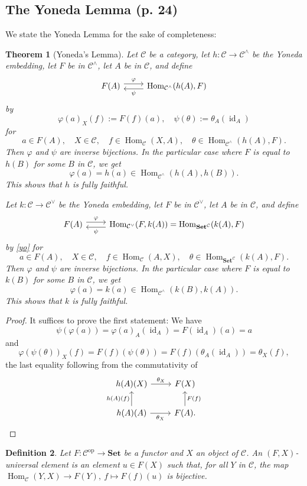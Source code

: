 \documentclass[12pt]{article}
\newtheorem{thm}{Theorem}
\newtheorem{df}[thm]{Definition}%
\theoremstyle{remark}
\theoremstyle{definition}
\newcommand{\C}{\mathcal C}
\newcommand{\pp}{\varphi}
\newcommand{\Set}{\mathbf{Set}}
\DeclareMathOperator{\id}{id}
\DeclareMathOperator{\Hom}{Hom}%
\DeclareMathOperator{\op}{op}
\begin{document}
\subsection{The Yoneda Lemma (p. 24)}
%
We state the Yoneda Lemma for the sake of completeness:
%
\begin{thm}[Yoneda's Lemma]\label{yol}
Let $\C$ be a category, let $h:\C\to\C^\wedge$ be the Yoneda embedding, let $F$ be in $\C^\wedge$, let $A$ be in $\C$, and define 
$$
\begin{tikzcd} 
F(A)\ar[yshift=0.7ex]{r}{\varphi}&\Hom_{\C^\wedge}(h(A),F)\ar[yshift=-0.7ex]{l}{\psi}
\end{tikzcd}
$$
by 
\begin{equation}\label{yo}
\varphi(a)_X(f):=F(f)(a),\quad\psi(\theta):=\theta_A(\id_A)
\end{equation}
for 
$$
a\in F(A),\quad X\in\C,\quad f\in\Hom_\C(X,A),\quad\theta\in\Hom_{\C^\wedge}(h(A),F).
$$ 
Then $\varphi$ and $\psi$ are inverse bijections. In the particular case where $F$ is equal to $h(B)$ for some $B$ in $\C$, we get 
$$
\varphi(a)=h(a)\in\Hom_{\C^\wedge}(h(A),h(B)).
$$
This shows that $h$ is fully faithful.

Let $k:\C\to\C^\vee$ be the Yoneda embedding, let $F$ be in $\C^\vee$, let $A$ be in $\C$, and define 
$$
\begin{tikzcd} 
F(A)\ar[yshift=0.7ex]{r}{\varphi}&\Hom_{\C^\vee}(F,k(A))=\Hom_{\Set^\C}(k(A),F)\ar[yshift=-0.7ex]{l}{\psi}
\end{tikzcd}
$$
by \eqref{yo} for 
$$
a\in F(A),\quad X\in\C,\quad f\in\Hom_\C(A,X),\quad\theta\in\Hom_{\Set^\C}(k(A),F).
$$ 
Then $\varphi$ and $\psi$ are inverse bijections. In the particular case where $F$ is equal to $k(B)$ for some $B$ in $\C$, we get 
$$
\varphi(a)=k(a)\in\Hom_{\C^\wedge}(k(B),k(A)).
$$
This shows that $k$ is fully faithful.
\end{thm}
%
\begin{proof}
It suffices to prove the first statement: We have 
$$
\psi(\pp(a))=\pp(a)_A(\id_A)=F(\id_A)(a)=a
$$ 
and
$$
\pp(\psi(\theta))_X(f)=F(f)(\psi(\theta))=F(f)(\theta_A(\id_A))=\theta_X(f),
$$ 
the last equality following from the commutativity of 
$$
\begin{tikzcd}
h(A)(X)\ar{r}{\theta_X}&F(X)\\ 
h(A)(A)\ar{u}{h(A)(f)}\ar{r}[swap]{\theta_X}&F(A).\ar{u}[swap]{F(f)}
\end{tikzcd}
$$
\end{proof}
%
\begin{df}\label{ue} 
Let $F:\C^{\op}\to\Set$ be a functor and $X$ an object of $\C$. An $(F,X)$-{\em universal element} is an element $u\in F(X)$ such that, for all $Y$ in $\C$, the map $\Hom_\C(Y,X)\to F(Y),\ f\mapsto F(f)(u)$ is bijective. 
\end{df}
\end{document}
